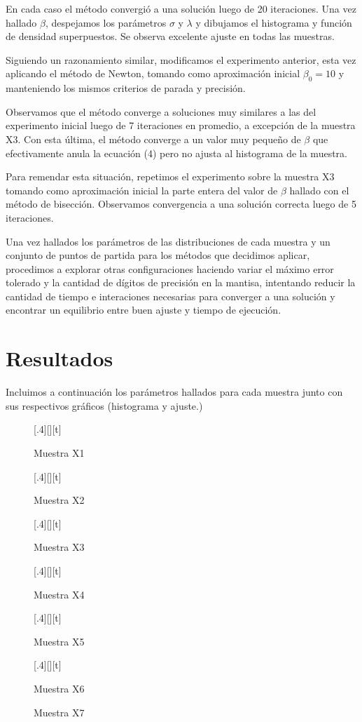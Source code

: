 \documentclass[a4paper,10pt,twoside]{article}
\newcommand{\grafico}[2]{
	\begin{figure}[H]
		\caption{#2}
		\centering
		
	\end{figure}
}
\newcommand{\graficodoble}[4]{
	\begin{figure}[H]
		\begin{floatrow}
			\floatbox{figure}[.4\textwidth][\FBheight][t]
			{\caption{#2}}
			{}
			\hspace*{1cm}
			\floatbox{figure}[.4\textwidth][\FBheight][t]
			{\caption{#4}}
			{}
		\end{floatrow}
	\end{figure}	
}
\newcommand{\incluircsv}[4]{
	\begin{center}
		\csvreader[tabular=#2,
		           table head=\hline #3 \\\hline,
		           late after line=\\,
		           late after last line=\\\hline,
		           head to column names]
		          {#1}{}{#4}
	\end{center}              
}
\begin{document}
En cada caso el método convergió a una solución luego de 20 iteraciones.
Una vez hallado $\beta$, despejamos los parámetros $\sigma$ y $\lambda$ y
dibujamos el histograma y función de densidad superpuestos. Se observa
excelente ajuste en todas las muestras.

Siguiendo un razonamiento similar, modificamos el experimento anterior,
esta vez aplicando el método de Newton, tomando como aproximación inicial
$\beta_0 = 10$ y manteniendo los mismos criterios de parada y precisión.

Observamos que el método converge a soluciones muy similares a las del
experimento inicial luego de 7 iteraciones en promedio, a excepción de la
muestra X3. Con esta última, el método converge a un valor muy pequeño de
$\beta$ que efectivamente anula la ecuación (4) pero no ajusta al histograma
de la muestra.

Para remendar esta situación, repetimos el experimento sobre la muestra X3
tomando como aproximación inicial la parte entera del valor de $\beta$ hallado
con el método de bisección. Observamos convergencia a una solución correcta
luego de 5 iteraciones.

Una vez hallados los parámetros de las distribuciones de cada muestra y un
conjunto de puntos de partida para los métodos que decidimos aplicar,
procedimos a explorar otras configuraciones haciendo variar el máximo error
tolerado y la cantidad de dígitos de precisión en la mantisa, intentando
reducir la cantidad de tiempo e interaciones necesarias para converger a una
solución y encontrar un equilibrio entre buen ajuste y tiempo de ejecución.




\section{Resultados}

Incluimos a continuación los parámetros hallados para cada muestra junto
con sus respectivos gráficos (histograma y ajuste.)

\incluircsv{final.csv}
           {|c|c|c|c|}
           {Muestra & $\sigma$ & $\beta$ & $\lambda$}
           {\Muestra & \Sigma & \Beta & \Lambda}

\graficodoble{X1-final.tex}{Muestra X1}{X2-final.tex}{Muestra X2}
\graficodoble{X3-final.tex}{Muestra X3}{X4-final.tex}{Muestra X4}
\graficodoble{X5-final.tex}{Muestra X5}{X6-final.tex}{Muestra X6}
\grafico{X7-final.tex}{Muestra X7}
\end{document}
